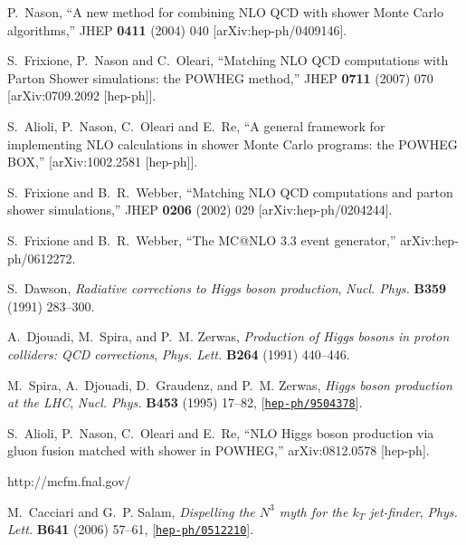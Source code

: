 \documentclass[paper]{JHEP3}
\begin{document}
\begin{thebibliography}{10}

  P.~Nason,
``A new method for combining NLO QCD with shower Monte Carlo algorithms,''
  JHEP {\bf 0411} (2004) 040
  [arXiv:hep-ph/0409146].

  S.~Frixione, P.~Nason and C.~Oleari,
``Matching NLO QCD computations with Parton Shower simulations: the POWHEG
method,''
  JHEP {\bf 0711} (2007) 070
  [arXiv:0709.2092 [hep-ph]].


  S.~Alioli, P.~Nason, C.~Oleari and E.~Re,
``A general framework for implementing NLO calculations in shower Monte Carlo
  programs: the POWHEG BOX,''
  [arXiv:1002.2581 [hep-ph]].

  S.~Frixione and B.~R.~Webber,
 ``Matching NLO QCD computations and parton shower simulations,''
  JHEP {\bf 0206} (2002) 029
  [arXiv:hep-ph/0204244].

  S.~Frixione and B.~R.~Webber,
  ``The MC@NLO 3.3 event generator,''
  arXiv:hep-ph/0612272.

S.~Dawson, {\it {Radiative corrections to Higgs boson production}},  {\em Nucl.
  Phys.} {\bf B359} (1991) 283--300.

A.~Djouadi, M.~Spira, and P.~M. Zerwas, {\it {Production of Higgs bosons in
  proton colliders: QCD corrections}},  {\em Phys. Lett.} {\bf B264} (1991)
  440--446.

M.~Spira, A.~Djouadi, D.~Graudenz, and P.~M. Zerwas, {\it {Higgs boson
  production at the LHC}},  {\em Nucl. Phys.} {\bf B453} (1995) 17--82,
  [\href{http://xxx.lanl.gov/abs/hep-ph/9504378}{{\tt hep-ph/9504378}}].

  S.~Alioli, P.~Nason, C.~Oleari and E.~Re,
``NLO Higgs boson production via gluon fusion matched with shower in
  POWHEG,''
  arXiv:0812.0578 [hep-ph].

  http://mcfm.fnal.gov/


M.~Cacciari and G.~P. Salam, {\it {Dispelling the $N^3$ myth for the $k_T$
  jet-finder}},  {\em Phys. Lett.} {\bf B641} (2006) 57--61,
  [\href{http://xxx.lanl.gov/abs/hep-ph/0512210}{{\tt hep-ph/0512210}}].



\end{thebibliography}
\end{document}

